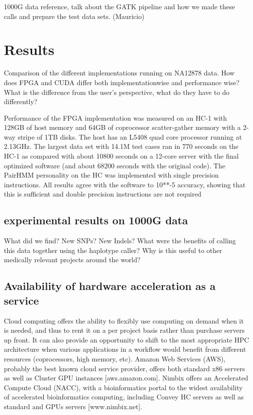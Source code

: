 \documentclass[11pt, oneside]{article}
\begin{document}
	1000G data reference, talk about the GATK pipeline and how we made these
	calls and prepare the test data sets. (Mauricio) 
	
	\section{Results}

	Comparison of the different implementations running on NA12878 data.  How
	does FPGA and CUDA differ both implementationwise and performance wise?
	What is the difference from the user's perspective, what do they have to do
	differently?  
	
	Performance of the FPGA implementation was measured on an HC-1 with 128GB of
	host memory and 64GB of coprocessor scatter-gather memory with a 2-way
	stripe of 1TB disks.  The host has an L5408 quad core processor running at
	2.13GHz.  The largest data set with 14.1M test cases ran in 770 seconds on
	the HC-1 as compared with about 10800 seconds on a 12-core server with the
	final optimized software (and about 68200 seconds with the original code).
	The PairHMM personality on the HC was implemented with single precision
	instructions.  All results agree with the software to 10**-5 accuracy,
	showing that this is sufficient and double precision instructions are not
	required

	\subsection{experimental results on 1000G data} 
	
	What did we find? New SNPs? New Indels?  What were the benefits of calling
	this data together using the haplotype caller?  Why is this useful to other
	medically relevant projects around the world?  \subsection{Availability of
	hardware acceleration as a service} Cloud computing offers the ability
	to flexibly use computing on demand when it is needed, and thus to rent
	it on a per project basis rather than purchase servers up front.  It can
	also provide an opportunity to shift to the most appropriate HPC
	architecture when various applications in a workflow would benefit from
	different resources (coprocessors, high memory, etc).  Amazon Web
	Services (AWS), probably the best known cloud service provider, offers
	both standard x86 servers as well as Cluster GPU instances
	[aws.amazon.com].  Nimbix offers an Accelerated Compute Cloud (NACC),
	with a bioinformatics portal to the widest availability of accelerated
	bioinformatics computing, including Convey HC servers as well as
	standard and GPUs servers [www.nimbix.net].
\end{document}
